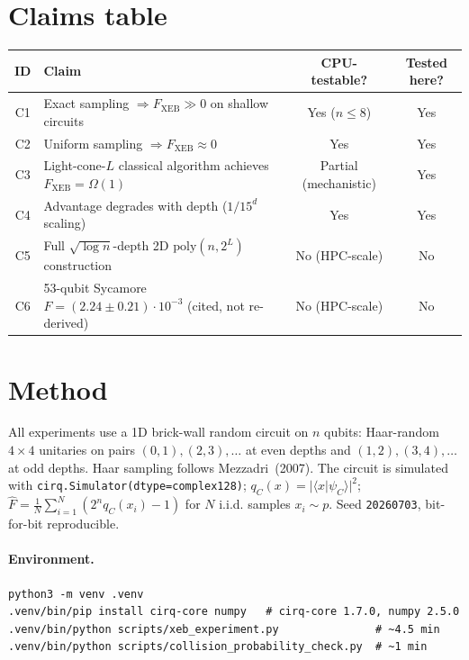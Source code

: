 \documentclass[11pt]{article}
\begin{document}
\section{Claims table}

\begin{center}\small
\begin{tabular}{clcc}
\toprule
ID & Claim & CPU-testable? & Tested here? \\
\midrule
C1 & Exact sampling $\Rightarrow F_{\mathrm{XEB}}\gg 0$ on shallow circuits & Yes ($n\le 8$) & Yes \\
C2 & Uniform sampling $\Rightarrow F_{\mathrm{XEB}}\approx 0$ & Yes & Yes \\
C3 & Light-cone-$L$ classical algorithm achieves $F_{\mathrm{XEB}}=\Omega(1)$ & Partial (mechanistic) & Yes \\
C4 & Advantage degrades with depth ($1/15^d$ scaling) & Yes & Yes \\
C5 & Full $\sqrt{\log n}$-depth 2D $\mathrm{poly}(n,2^L)$ construction & No (HPC-scale) & No \\
C6 & 53-qubit Sycamore $F=(2.24\pm 0.21)\cdot 10^{-3}$ (cited, not re-derived) & No (HPC-scale) & No \\
\bottomrule
\end{tabular}
\end{center}

\section{Method}

All experiments use a 1D brick-wall random circuit on $n$ qubits:
Haar-random $4\times 4$ unitaries on pairs $(0,1),(2,3),\ldots$ at even
depths and $(1,2),(3,4),\ldots$ at odd depths. Haar sampling follows
Mezzadri~(2007). The circuit is simulated with
\texttt{cirq.Simulator(dtype=complex128)}; $q_C(x) = |\langle
x|\psi_C\rangle|^2$; $\hat F = \frac{1}{N}\sum_{i=1}^N (2^n q_C(x_i) -
1)$ for $N$ i.i.d. samples $x_i\sim p$. Seed \texttt{20260703}, bit-for-bit
reproducible.

\paragraph{Environment.}
\begin{lstlisting}
python3 -m venv .venv
.venv/bin/pip install cirq-core numpy   # cirq-core 1.7.0, numpy 2.5.0
.venv/bin/python scripts/xeb_experiment.py               # ~4.5 min
.venv/bin/python scripts/collision_probability_check.py  # ~1 min
\end{lstlisting}
\end{document}
